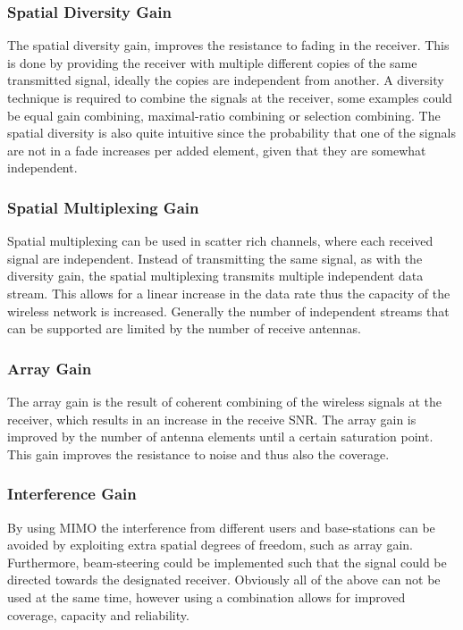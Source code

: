 \subsubsection{Spatial Diversity Gain}
The spatial diversity gain, improves the resistance to fading in the receiver. This is done by providing the receiver with multiple different copies of the same transmitted signal, ideally the copies are independent from another. A diversity technique is required to combine the signals at the receiver\cite{Ezio2007MIMO}, some examples could be equal gain combining, maximal-ratio combining or selection combining. The spatial diversity is also quite intuitive since the probability that one of the signals are not in a fade increases per added element, given that they are somewhat independent. 
 
\subsubsection{Spatial Multiplexing Gain}
Spatial multiplexing can be used in scatter rich channels, where each received signal are independent. Instead of transmitting the same signal, as with the diversity gain, the spatial multiplexing transmits multiple independent data stream. This allows for a linear increase in the data rate thus the capacity of the wireless network is increased. Generally the number of independent streams that can be supported are limited by the number of receive antennas. \cite{}

\subsubsection{Array Gain}
The array gain is the result of coherent combining of the wireless signals at the receiver, which results in an increase in the receive SNR. The array gain is improved by the number of antenna elements until a certain saturation point. This gain improves the resistance to noise and thus also the coverage. \cite{} 
  
\subsubsection{Interference Gain}
By using MIMO the interference from different users and base-stations can be avoided by exploiting extra spatial degrees of freedom, such as array gain. Furthermore, beam-steering could be implemented such that the signal could be directed towards the designated receiver. Obviously all of the above can not be used at the same time, however using a combination  allows for improved coverage, capacity and reliability. \cite{}
 
